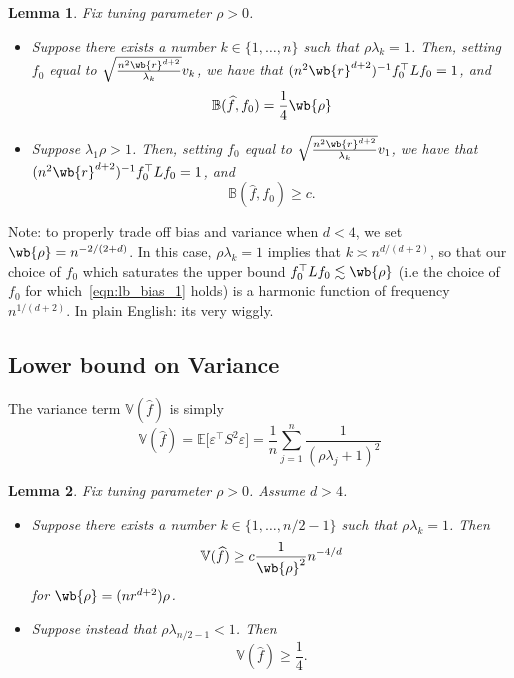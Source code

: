 \documentclass{article}
\newcommand{\1}{\mathbf{1}}
\newcommand{\Lap}{L}
\newcommand{\Ebb}{\mathbb{E}}
\newcommand{\wh}[1]{\widehat{#1}}
\newtheorem{lemma}{Lemma}
\theoremstyle{definition}
\theoremstyle{remark}
\begin{document}
\begin{lemma}
	\label{lem:lb_bias}
	Fix tuning parameter $\rho > 0$. 
	\begin{itemize}
		\item Suppose there exists a number $k \in \{1,\ldots,n\}$ such that $\rho \lambda_k = 1$. Then, setting $f_0$ equal to $\sqrt{\frac{n^2 \wb{r}^{d + 2}}{\lambda_k}}v_k$, we have that $(n^2\wb{r}^{d + 2})^{-1}f_0^{\top}\Lap f_0 = 1$, and 
		\begin{equation}
		\label{eqn:lb_bias_1}
		\mathbb{B}(\wh{f},f_0) = \frac{1}{4}\wb{\rho}
		\end{equation}
		\item Suppose $\lambda_1 \rho > 1$. Then, setting $f_0$ equal to $\sqrt{\frac{n^2 \wb{r}^{d + 2}}{\lambda_k}}v_1$, we have that $(n^2\wb{r}^{d + 2})^{-1}f_0^{\top}\Lap f_0 = 1$, and 
		\begin{equation}
		\label{eqn:lb_bias_2}
		\mathbb{B}(\wh{f},f_0) \geq c.
		\end{equation}
	\end{itemize}
\end{lemma}
Note: to properly trade off bias and variance when $d < 4$, we set $\wb{\rho} = n^{-2/(2 + d)}$. In this case, $\rho \lambda_k = 1$ implies that $k \asymp n^{d/(d + 2)}$, so that our choice of $f_0$ which saturates the upper bound $f_0^{\top} \Lap f_0 \lesssim \wb{\rho}$ (i.e the choice of $f_0$ for which~\eqref{eqn:lb_bias_1} holds) is a harmonic function of frequency $n^{1/(d + 2)}$. In plain English: its very wiggly.


\subsection{Lower bound on Variance}
The variance term $\mathbb{V}(\wh{f})$ is simply
\begin{equation*}
\mathbb{V}(\wh{f}) = \Ebb\bigl[\varepsilon^{\top} S^2 \varepsilon\bigr] = \frac{1}{n}\sum_{j = 1}^{n} \frac{1}{(\rho \lambda_j + 1)^2}
\end{equation*} 

\begin{lemma}
	\label{lem:lb_variance}
	Fix tuning parameter $\rho > 0$. Assume $d > 4$.
	\begin{itemize}
		\item Suppose there exists a number $k \in \{1,\ldots,n/2 - 1\}$ such that $\rho \lambda_k = 1$. Then
		\begin{equation}
		\label{eqn:lb_variance_1}
		\mathbb{V}(\wh{f}) \geq c\frac{1}{\wb{\rho}^2}n^{-4/d}
		\end{equation}
		for $\wb{\rho} = (nr^{d + 2})\rho$. 
		\item Suppose instead that $\rho \lambda_{n/2 - 1} < 1$. Then
		\begin{equation}
		\label{eqn:lb_variance_2}
		\mathbb{V}(\wh{f}) \geq \frac{1}{4}.
		\end{equation}
	\end{itemize}
\end{lemma}
\end{document}
